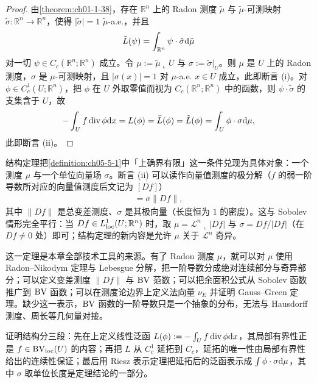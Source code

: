 \documentclass[../../main.tex]{subfiles}%
\begin{document}
\begin{proof}
由\cref{theorem:ch01-1-38}，存在 $\mathbb{R}^n$ 上的 Radon 测度 $\tilde\mu$ 与 $\tilde\mu$-可测映射 $\tilde\sigma:\mathbb{R}^n\to\mathbb{R}^n$，使得 $\lvert\tilde\sigma\rvert=1$ $\tilde\mu$-a.e.，并且 %
\begin{align*}
\tilde L(\psi)=\int_{\mathbb{R}^n}\psi\cdot\tilde\sigma\mathrm{d}\tilde\mu
\end{align*}
对一切 $\psi\in C_c(\mathbb{R}^n;\mathbb{R}^n)$ 成立。令 $\mu:=\tilde\mu\llcorner U$ 与 $\sigma:=\tilde\sigma|_U$。则 $\mu$ 是 $U$ 上的 Radon 测度，$\sigma$ 是 $\mu$-可测映射，且 $\lvert\sigma(x)\rvert=1$ 对 $\mu$-a.e. $x\in U$ 成立，此即断言 (i)。对 $\phi\in C_c^1(U;\mathbb{R}^n)$，把 $\phi$ 在 $U$ 外取零值而视为 $C_c(\mathbb{R}^n;\mathbb{R}^n)$ 中的函数，则 $\psi\cdot\tilde\sigma$ 的支集含于 $U$，故
\begin{align*}
-\int_U f\operatorname{div}\phi\mathrm{d} x=L(\phi)=\bar L(\phi)=\tilde L(\phi)=\int_U\phi\cdot\sigma\mathrm{d}\mu,
\end{align*}
此即断言 (ii)。
\end{proof}

\begin{remark}\label{remark:ch05-thm-5-1-动机}
结构定理把\cref{definition:ch05-5-1}中「上确界有限」这一条件兑现为具体对象：一个测度 $\mu$ 与一个单位向量场 $\sigma$。断言 (ii) 可以读作向量值测度的极分解（$f$ 的弱一阶导数所对应的向量值测度后文记为 $[Df]$） %
\begin{align*}
[Df]=\sigma\lVert Df\rVert,
\end{align*}
其中 $\lVert Df\rVert$ 是总变差测度、$\sigma$ 是其极向量（长度恒为 $1$ 的密度）。这与 Sobolev 情形完全平行：当 $Df\in L^1_{\mathrm{loc}}(U;\mathbb{R}^n)$ 时，取 $\mu=\mathcal{L}^n\llcorner\lvert Df\rvert$ 与 $\sigma=Df/\lvert Df\rvert$（在 $Df\neq0$ 处）即可；结构定理的新内容是允许 $\mu$ 关于 $\mathcal{L}^n$ 奇异。%

这一定理是本章全部技术工具的来源。有了 Radon 测度 $\mu$，就可以对 $\mu$ 使用 Radon--Nikodym 定理与 Lebesgue 分解，把一阶导数分成绝对连续部分与奇异部分；可以定义变差测度 $\lVert Df\rVert$ 与 $\mathrm{BV}$ 范数；可以把余面积公式从 Sobolev 函数推广到 $\mathrm{BV}$ 函数；可以在测度论边界上定义法向量 $\nu_E$ 并证明 Gauss--Green 定理。缺少这一表示，$\mathrm{BV}$ 函数的一阶导数只是一个抽象的分布，无法与 Hausdorff 测度、周长等几何量对接。

证明结构分三段：先在上定义线性泛函 $L(\phi):=-\int_U f\operatorname{div}\phi\mathrm{d} x$，其局部有界性正是 $f\in\mathrm{BV}_{\mathrm{loc}}(U)$ 的内容；再把 $L$ 从 $C_c^1$ 延拓到 $C_c$，延拓的唯一性由局部有界性给出的连续性保证；最后用 Riesz 表示定理把延拓后的泛函表示成 $\int\phi\cdot\sigma\mathrm{d}\mu$，其中 $\sigma$ 取单位长度是定理结论的一部分。
\end{remark}
\end{document}
